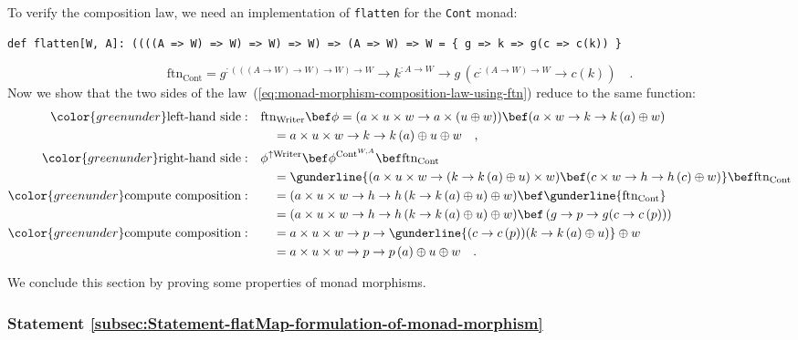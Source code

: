 To verify the composition law, we need an implementation of \lstinline!flatten!
for the \lstinline!Cont! monad:
\begin{lstlisting}
def flatten[W, A]: ((((A => W) => W) => W) => W) => (A => W) => W = { g => k => g(c => c(k)) }
\end{lstlisting}
\[
\text{ftn}_{\text{Cont}}=g^{:\left(\left(\left(A\rightarrow W\right)\rightarrow W\right)\rightarrow W\right)\rightarrow W}\rightarrow k^{:A\rightarrow W}\rightarrow g\,(c^{:\left(A\rightarrow W\right)\rightarrow W}\rightarrow c\left(k\right))\quad.
\]
Now we show that the two sides of the law~(\ref{eq:monad-morphism-composition-law-using-ftn})
reduce to the same function:
\begin{align*}
{\color{greenunder}\text{left-hand side}:}\quad & \text{ftn}_{\text{Writer}}\bef\phi=(a\times u\times w\rightarrow a\times(u\oplus w))\bef(a\times w\rightarrow k\rightarrow k\left(a\right)\oplus w)\\
 & \quad=a\times u\times w\rightarrow k\rightarrow k\left(a\right)\oplus u\oplus w\quad,\\
{\color{greenunder}\text{right-hand side}:}\quad & \phi^{\uparrow\text{Writer}}\bef\phi^{\text{Cont}^{W,A}}\bef\text{ftn}_{\text{Cont}}\\
 & \quad=\gunderline{(a\times u\times w\rightarrow(k\rightarrow k\left(a\right)\oplus u)\times w)\bef(c\times w\rightarrow h\rightarrow h\left(c\right)\oplus w)}\bef\text{ftn}_{\text{Cont}}\\
{\color{greenunder}\text{compute composition}:}\quad & \quad=(a\times u\times w\rightarrow h\rightarrow h\left(k\rightarrow k\left(a\right)\oplus u\right)\oplus w)\bef\gunderline{\text{ftn}_{\text{Cont}}}\\
 & \quad=(a\times u\times w\rightarrow h\rightarrow h\left(k\rightarrow k\left(a\right)\oplus u\right)\oplus w)\bef\left(g\rightarrow p\rightarrow g(c\rightarrow c\left(p\right))\right)\\
{\color{greenunder}\text{compute composition}:}\quad & \quad=a\times u\times w\rightarrow p\rightarrow\gunderline{(c\rightarrow c\left(p\right))(k\rightarrow k\left(a\right)\oplus u)}\oplus w\\
 & \quad=a\times u\times w\rightarrow p\rightarrow p\left(a\right)\oplus u\oplus w\quad.
\end{align*}

We conclude this section by proving some properties of monad morphisms.

\subsubsection{Statement \label{subsec:Statement-flatMap-formulation-of-monad-morphism}\ref{subsec:Statement-flatMap-formulation-of-monad-morphism}}

